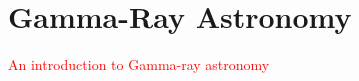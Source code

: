 \chapter{Gamma-Ray Astronomy}
\label{ch:gamma-ray-astronomy}

\textcolor{red}{An introduction to Gamma-ray astronomy}
